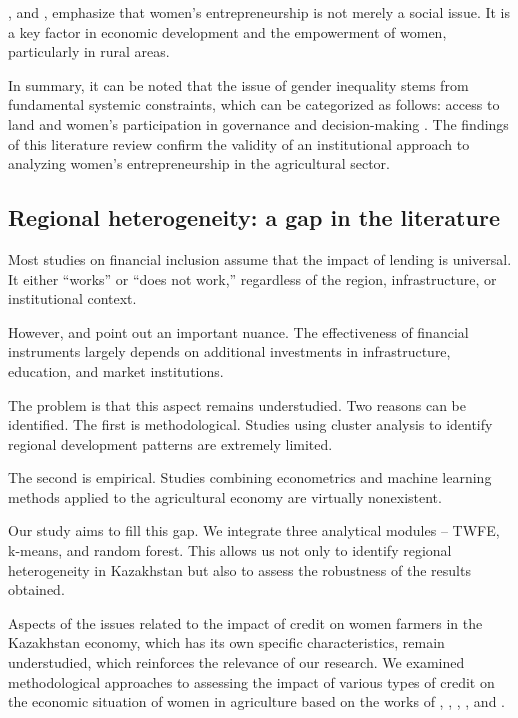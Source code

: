 ﻿\documentclass[pdflatex,sn-mathphys-ay]{sn-jnl}
\begin{document}
\citet{ref89}, and \citet{ref19},
emphasize that women's entrepreneurship is not merely a social issue. It
is a key factor in economic development and the empowerment of women,
particularly in rural areas.

In summary, it can be noted that the issue of gender inequality stems
from fundamental systemic constraints, which can be categorized as
follows: access to land \citep{ref39,ref06,ref102,ref52,ref12} and women's participation in governance and decision-making
\citep{ref79,ref40,ref08,ref09,ref69}. The findings of this literature review
confirm the validity of an institutional approach to analyzing women's
entrepreneurship in the agricultural sector.

\subsection{Regional heterogeneity: a gap in the literature}

Most studies on financial inclusion assume that the impact of lending is
universal. It either ``works'' or ``does not work,'' regardless of the
region, infrastructure, or institutional context.

However, \citet{ref21} and \citet{ref17}
point out an important nuance. The effectiveness of financial
instruments largely depends on additional investments in infrastructure,
education, and market institutions.

The problem is that this aspect remains understudied. Two reasons can be
identified. The first is methodological. Studies using cluster analysis
to identify regional development patterns are extremely limited.

The second is empirical. Studies combining econometrics and machine
learning methods applied to the agricultural economy are virtually
nonexistent.

Our study aims to fill this gap. We integrate three analytical modules
-- TWFE, k-means, and random forest. This allows us not only to identify
regional heterogeneity in Kazakhstan but also to assess the robustness
of the results obtained.

Aspects of the issues related to the impact of credit on women farmers
in the Kazakhstan economy, which has its own specific characteristics,
remain understudied, which reinforces the relevance of our research. We
examined methodological approaches to assessing the impact of various
types of credit on the economic situation of women in agriculture based
on the works of \citet{ref10}, \citet{ref03}, \citet{ref30}, \citet{ref41}, and \citet{ref59}.
\end{document}
